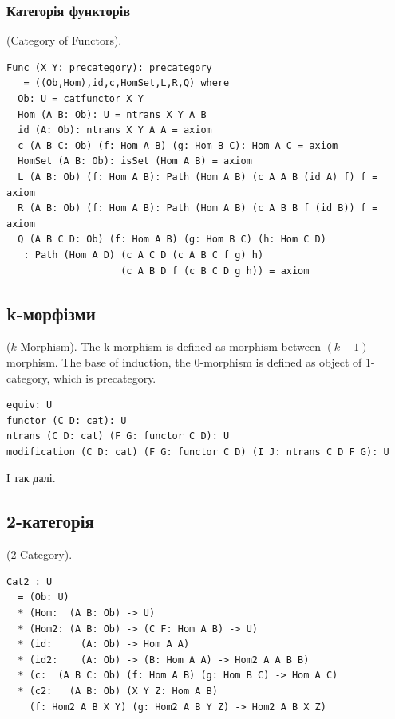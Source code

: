 \begin{definition}
\subsubsection{Категорія функторів}
\begin{definition} (Category of Functors).
\begin{lstlisting}
Func (X Y: precategory): precategory
   = ((Ob,Hom),id,c,HomSet,L,R,Q) where
  Ob: U = catfunctor X Y
  Hom (A B: Ob): U = ntrans X Y A B
  id (A: Ob): ntrans X Y A A = axiom
  c (A B C: Ob) (f: Hom A B) (g: Hom B C): Hom A C = axiom
  HomSet (A B: Ob): isSet (Hom A B) = axiom
  L (A B: Ob) (f: Hom A B): Path (Hom A B) (c A A B (id A) f) f = axiom
  R (A B: Ob) (f: Hom A B): Path (Hom A B) (c A B B f (id B)) f = axiom
  Q (A B C D: Ob) (f: Hom A B) (g: Hom B C) (h: Hom C D)
   : Path (Hom A D) (c A C D (c A B C f g) h)
                    (c A B D f (c B C D g h)) = axiom
\end{lstlisting}
\end{definition}

\subsection{k-морфізми}

\begin{definition} ($k$-Morphism).
The k-morphism is defined as morphism
between $(k-1)$-morphism. The base of induction, the $0$-morphism is
defined as object of $1$-category, which is precategory.
\begin{lstlisting}
equiv: U
functor (C D: cat): U
ntrans (C D: cat) (F G: functor C D): U
modification (C D: cat) (F G: functor C D) (I J: ntrans C D F G): U
\end{lstlisting}
І так далі.
\end{definition}

\subsection{2-категорія}
\begin{definition} (2-Category).
\begin{lstlisting}
Cat2 : U
  = (Ob: U)
  * (Hom:  (A B: Ob) -> U)
  * (Hom2: (A B: Ob) -> (C F: Hom A B) -> U)
  * (id:     (A: Ob) -> Hom A A)
  * (id2:    (A: Ob) -> (B: Hom A A) -> Hom2 A A B B)
  * (c:  (A B C: Ob) (f: Hom A B) (g: Hom B C) -> Hom A C)
  * (c2:   (A B: Ob) (X Y Z: Hom A B)
    (f: Hom2 A B X Y) (g: Hom2 A B Y Z) -> Hom2 A B X Z)
\end{lstlisting}
\end{definition}


\end{definition}
